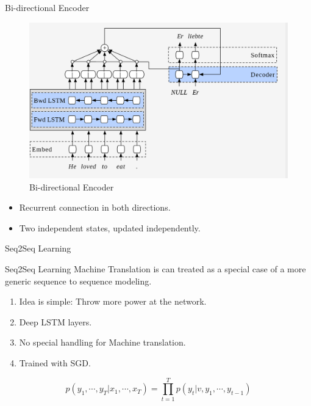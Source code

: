 ﻿\documentclass[table,aspectratio=43,mathserif,xcolor={usenames,dvipsnames,svgnames,table},10pt]{beamer}
\begin{document}
\begin{frame}{Bi-directional Encoder}
 
 \begin{figure}[h]
    \includegraphics[width=0.9\linewidth]{images/birnn.png}  
    \caption{Bi-directional Encoder}
  \end{figure}
  \begin{itemize}
   \item<+-> Recurrent connection in both directions.
   \item<+-> Two independent states, updated independently.
  \end{itemize}
\end{frame}


\begin{section}{Seq2Seq Learning}
\end{section}

\begin{frame}{Seq2Seq Learning}
 Machine Translation is can treated as a special case of a more generic sequence to sequence modeling.
 \begin{enumerate}
  \item<+-> Idea is simple: Throw more power at the network.
  \item<+-> Deep LSTM layers.
  \item<+-> No special handling for Machine translation.
  \item<+-> Trained with SGD.
 \end{enumerate}
$$ p(y_1, \cdots, y_T| x_1, \cdots, x_T) = \prod_{t=1}^{T} p(y_t| v, y_1, \cdots, y_{t-1})$$
\end{frame}
\end{document}
